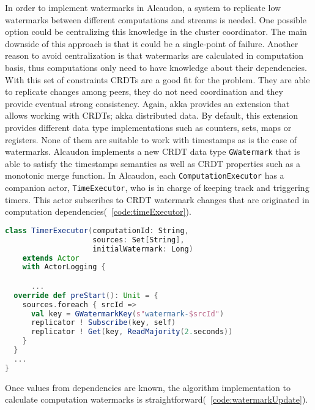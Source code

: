 In order to implement watermarks in Alcaudon, a system to replicate low
watermarks between different computations and streams is needed. One possible
option could be centralizing this knowledge in the cluster coordinator. The main
downside of this approach is that it could be a single-point of failure. Another
reason to avoid centralization is that watermarks are calculated in computation
basis, thus computations only need to have knowledge about their dependencies.
With this set of constraints \acs{CRDT}s are a good fit for the problem. They
are able to replicate changes among peers, they do not need coordination and
they provide eventual strong consistency. Again, akka provides an extension that
allows working with \acs{CRDT}s; akka distributed data. By default, this
extension provides different data type implementations such as counters, sets,
maps or registers. None of them are suitable to work with timestamps as is the
case of watermarks. Alcaudon implements a new \acs{CRDT} data type
\lstinline{GWatermark} that is able to satisfy the timestamps semantics as well
as \acs{CRDT} properties such as a monotonic merge function.
In Alcaudon, each \lstinline[columns=fixed]{ComputationExecutor} has a companion
actor, \lstinline[columns=fixed]{TimeExecutor}, who is in charge of keeping track
and triggering timers. This actor subscribes to \acs{CRDT} watermark changes that are
originated in computation dependencies(~\ref{code:timeExecutor}).

\begin{lstlisting}[language=scala, frame=trBL, label=code:timeExecutor, float=ht, caption = {TimerExecutor \acs{CRDT}s dependencies subscription}]
class TimerExecutor(computationId: String,
                    sources: Set[String],
                    initialWatermark: Long)
    extends Actor
    with ActorLogging {

      ...
  override def preStart(): Unit = {
    sources.foreach { srcId =>
      val key = GWatermarkKey(s"watermark-$srcId")
      replicator ! Subscribe(key, self)
      replicator ! Get(key, ReadMajority(2.seconds))
    }
  }
  ...
}
\end{lstlisting}

Once values from dependencies are known, the algorithm implementation to
calculate computation watermarks is straightforward(~\ref{code:watermarkUpdate}).


